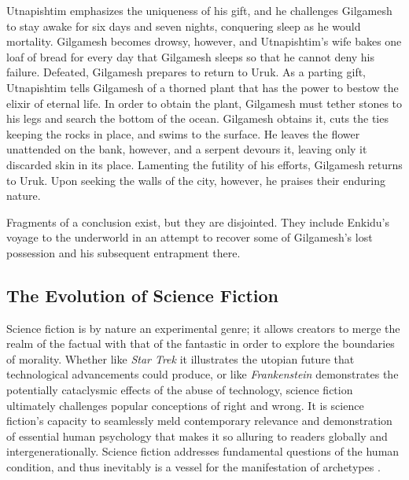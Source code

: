 \documentclass[10pt,a4paper]{article}
\begin{document}
Utnapishtim emphasizes the uniqueness of his gift, and he challenges Gilgamesh to stay awake for six days and seven nights, conquering sleep as he would mortality. Gilgamesh becomes drowsy, however, and Utnapishtim’s wife bakes one loaf of bread for every day that Gilgamesh sleeps so that he cannot deny his failure. Defeated, Gilgamesh prepares to return to Uruk. As a parting gift, Utnapishtim tells Gilgamesh of a thorned plant that has the power to bestow the elixir of eternal life. In order to obtain the plant, Gilgamesh must tether stones to his legs and search the bottom of the ocean. Gilgamesh obtains it, cuts the ties keeping the rocks in place, and swims to the surface. He leaves the flower unattended on the bank, however, and a serpent devours it, leaving only it discarded skin in its place. Lamenting the futility of his efforts, Gilgamesh returns to Uruk. Upon seeking the walls of the city, however, he praises their enduring nature.

Fragments of a conclusion exist, but they are disjointed. They include Enkidu’s voyage to the underworld in an attempt to recover some of Gilgamesh’s lost possession and his subsequent entrapment there.

%
%

\subsection{The Evolution of Science Fiction}

Science fiction is by nature an experimental genre; it allows creators to merge the realm of the factual with that of the fantastic in order to explore the boundaries of morality. Whether like \emph{Star Trek} it illustrates the utopian future that technological advancements could produce, or like \emph{Frankenstein} demonstrates the potentially cataclysmic effects of the abuse of technology, science fiction ultimately challenges popular conceptions of right and wrong. It is science fiction’s capacity to seamlessly meld contemporary relevance and demonstration of essential human psychology that makes it so alluring to readers globally and intergenerationally. Science fiction addresses fundamental questions of the human condition, and thus inevitably is a vessel for the manifestation of archetypes \cite{reich2013}.

%
\end{document}
